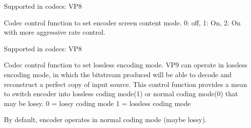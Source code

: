 \begin{Desc}
\begin{description}
Supported in codecs\+: V\+P8 \item[{\em 
V\+P8\+E\+\_\+\+S\+E\+T\+\_\+\+S\+C\+R\+E\+E\+N\+\_\+\+C\+O\+N\+T\+E\+N\+T\+\_\+\+M\+O\+DE\hypertarget{group__vp8__encoder_gga6deae3d561c838952552c3d3756322ecacbd74e1cbae2b8a95907ea5eabbbe590}{}\label{group__vp8__encoder_gga6deae3d561c838952552c3d3756322ecacbd74e1cbae2b8a95907ea5eabbbe590}
}]Codec control function to set encoder screen content mode. 0\+: off, 1\+: On, 2\+: On with more aggressive rate control.

Supported in codecs\+: V\+P8 \item[{\em 
V\+P9\+E\+\_\+\+S\+E\+T\+\_\+\+L\+O\+S\+S\+L\+E\+SS\hypertarget{group__vp8__encoder_gga6deae3d561c838952552c3d3756322eca7224f4edeeaf940584e6fe3ff2345b86}{}\label{group__vp8__encoder_gga6deae3d561c838952552c3d3756322eca7224f4edeeaf940584e6fe3ff2345b86}
}]Codec control function to set lossless encoding mode. V\+P9 can operate in lossless encoding mode, in which the bitstream produced will be able to decode and reconstruct a perfect copy of input source. This control function provides a mean to switch encoder into lossless coding mode(1) or normal coding mode(0) that may be lossy. 0 = lossy coding mode 1 = lossless coding mode

By default, encoder operates in normal coding mode (maybe lossy).


\end{description}
\end{Desc}
